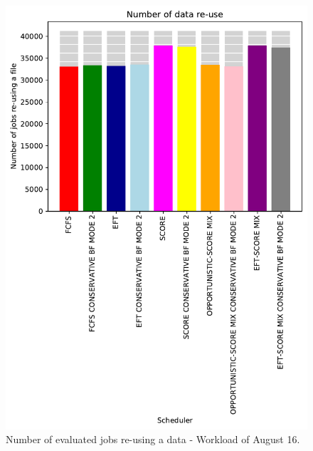 \documentclass[conference,10pt]{IEEEtran}
\begin{document}
\begin{figure}\centering\includegraphics[width=1\linewidth]{../MBSS/plot/Results_FCFS_Score_Backfill_2022-08-16->2022-08-16_V10000_Number_of_data_reuse_450_128_32_256_4_1024.pdf}\caption{Number of evaluated jobs re-using a data - Workload of August 16.}\end{figure}
\end{document}
